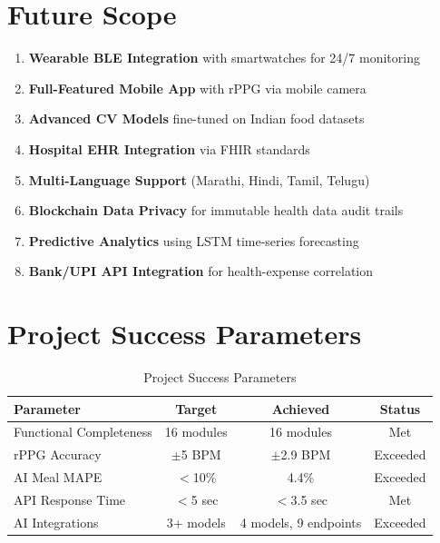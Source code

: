 \documentclass[12pt,a4paper]{report}
\begin{document}
\section{Future Scope}
\begin{enumerate}
  \item \textbf{Wearable BLE Integration} with smartwatches for 24/7 monitoring
  \item \textbf{Full-Featured Mobile App} with rPPG via mobile camera
  \item \textbf{Advanced CV Models} fine-tuned on Indian food datasets
  \item \textbf{Hospital EHR Integration} via FHIR standards
  \item \textbf{Multi-Language Support} (Marathi, Hindi, Tamil, Telugu)
  \item \textbf{Blockchain Data Privacy} for immutable health data audit trails
  \item \textbf{Predictive Analytics} using LSTM time-series forecasting
  \item \textbf{Bank/UPI API Integration} for health-expense correlation
\end{enumerate}

\section{Project Success Parameters}

\begin{table}[H]
\centering
\caption{Project Success Parameters}
\label{tab:success}
\begin{tabular}{|l|c|c|c|}
\hline
\textbf{Parameter} & \textbf{Target} & \textbf{Achieved} & \textbf{Status} \\
\hline
Functional Completeness & 16 modules & 16 modules & Met \\
rPPG Accuracy & $\pm$5 BPM & $\pm$2.9 BPM & Exceeded \\
AI Meal MAPE & $<$10\% & 4.4\% & Exceeded \\
API Response Time & $<$5 sec & $<$3.5 sec & Met \\
AI Integrations & 3+ models & 4 models, 9 endpoints & Exceeded \\
\hline
\end{tabular}
\end{table}
\end{document}
